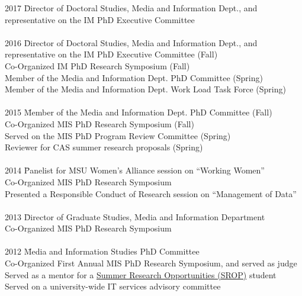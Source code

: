 \documentclass[9pt]{extarticle}
\begin{document}
\begin{tabbing}
2017 \hspace{0.3in}\= Director of Doctoral Studies, Media and Information Dept., and \\
\> \hspace{0.5cm} representative on the IM PhD Executive Committee \\\\

2016 \hspace{0.3in}\= Director of Doctoral Studies, Media and Information Dept., and \\
\> \hspace{0.5cm} representative on the IM PhD Executive Committee (Fall) \\
\> Co-Organized IM PhD Research Symposium (Fall) \\ %
\> Member of the Media and Information Dept. PhD Committee (Spring) \\ 
\> Member of the Media and Information Dept. Work Load Task Force (Spring) \\\\

2015 \hspace{0.3in}\= Member of the Media and Information Dept. PhD Committee (Fall) \\ %
\> Co-Organized MIS PhD Research Symposium (Fall) \\ %
\> Served on the MIS PhD Program Review Committee (Spring) \\ %
\> Reviewer for CAS summer research proposals (Spring) \\\\ %

2014 \hspace{0.3in}\=  Panelist for MSU Women's Alliance session on ``Working Women'' \\ %
\> Co-Organized MIS PhD Research Symposium \\ %
\> Presented a Responsible Conduct of Research session on ``Management of Data'' \\\\ %

2013 \hspace{0.3in}\=  Director of Graduate Studies, Media and Information Department \\
\> Co-Organized MIS PhD Research Symposium \\\\ 

2012 \hspace{0.3in}\=  Media and Information Studies PhD Committee \\
\> Co-Organized First Annual MIS PhD Research Symposium, and served as judge \\ %
\> Served as a mentor for a \href{https://grad.msu.edu/srop}{Summer Research Opportunities (SROP)} student \\ %
\> Served on a university-wide IT services advisory committee \\ %
\end{tabbing}
\end{document}
